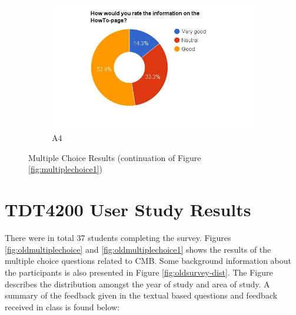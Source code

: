 \begin{figure}
    \begin{subfigure}[h]{0.45\textwidth}
        \centerline{\includegraphics[width=1.5\textwidth]{results/howto_cmb.jpg}}
        \caption{A4}
        \label{fig:cmb-howto}
    \end{subfigure}
    \caption[]{Multiple Choice Results (continuation of Figure \ref{fig:multiplechoice1})}
    \label{fig:multiplechoice2}
\end{figure}

\section{TDT4200 User Study Results}
There were in total 37 students completing the survey. Figures \ref{fig:oldmultiplechoice} and \ref{fig:oldmultiplechoice1} shows the results of the multiple choice questions related to CMB. Some background information about the participants is also presented in Figure \ref{fig:oldsurvey-dist}. The Figure describes the distribution amongst the year of study and area of study. A summary of the feedback given in the textual based questions and feedback received in class is found below:

